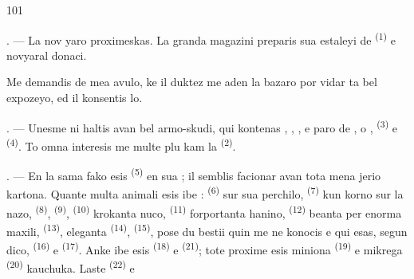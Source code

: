 %
%

\begin{VUpage}[103]{101}
\VUsaut{4.0mm}
\VUsaut{2.0mm}
\VUsaut{3.4mm}

. --- La nov yaro proximeskas. La granda\nl
magazini preparis sua estaleyi de  \textsuperscript{(1)} e\nl
novyaral donaci.

\VUblancAlinea
Me demandis de mea avulo, ke il duktez me\nl
aden la bazaro por vidar ta bel expozeyo, ed il\nl
konsentis lo.

. --- Unesme ni haltis avan bel armo-skudi,\nl
qui kontenas , , , \nl
e paro de , o ,  \textsuperscript{(3)} e \cc
{} \textsuperscript{(4)}. To omna interesis me multe plu kam la\nl
{} \textsuperscript{(2)}.

\VUsaut{3.0mm}
\VUsaut{2.6mm}

. --- En la sama fako esis  \textsuperscript{(5)} en\nl
sua  ; il semblis facionar avan tota mena\cc
jerio kartona. Quante multa animali esis ibe :\nl
{} \textsuperscript{(6)} sur sua perchilo,  \textsuperscript{(7)} kun\nl
korno sur la nazo,  \textsuperscript{(8)},  \textsuperscript{(9)}, \cc
{} \textsuperscript{(10)} krokanta nuco,  \textsuperscript{(11)} forportanta\nl
hanino,  \textsuperscript{(12)} beanta per enorma\nl
maxili,  \textsuperscript{(13)}, eleganta  \textsuperscript{(14)}, \cc
{} \textsuperscript{(15)}, pose du bestii quin me ne konocis e\nl
qui esas, segun dico,  \textsuperscript{(16)} e  \textsuperscript{(17)}.\nl
Anke ibe esis  \textsuperscript{(18)} e  \textsuperscript{(21)}; tote\nl
proxime esis miniona  \textsuperscript{(19)} e mikrega \cc
{} \textsuperscript{(20)} kauchuka. Laste  \textsuperscript{(22)} e \ccplein
\end{VUpage}

